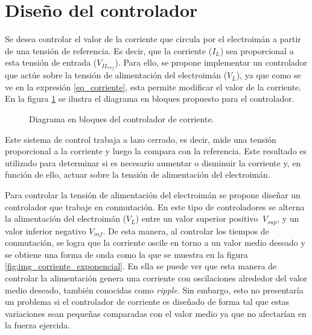 \section{Diseño del controlador}

Se desea controlar el valor de la corriente que circula por el electroimán a partir de una tensión de referencia. Es decir, que la corriente ($I_L$) sea proporcional a esta tensión de entrada ($V_{IL_{ref}}$). Para ello, se propone implementar un controlador que actúe sobre la tensión de alimentación del electroimán ($V_L$), ya que como se ve en la expresión \ref{eq_corriente}, esta permite modificar el valor de la corriente. En la figura \ref{fig:img_diagrama_bloques_basico_cc} se ilustra el diagrama en bloques propuesto para el controlador.


\begin{figure}[H]
	\centering
	
	\caption{Diagrama en bloques del controlador de corriente.}
	\label{fig:img_diagrama_bloques_basico_cc}
\end{figure}

Este sistema de control trabaja a lazo cerrado, es decir, mide una tensión proporcional a la corriente y luego la compara con la referencia. Este resultado es utilizado para determinar si es necesario aumentar o disminuir la corriente y, en función de ello, actuar sobre la tensión de alimentación del electroimán.

Para controlar la tensión de alimentación del electroimán se propone diseñar un controlador que trabaje en conmutación. En este tipo de controladores se alterna la alimentación del electroimán ($V_L$) entre un valor superior positivo $\ V_{sup}$, y un valor inferior negativo $V_{inf}$. De esta manera, al controlar los tiempos de conmutación, se logra que la corriente oscile en torno a un valor medio deseado y se obtiene una forma de onda como la que se muestra en la figura  \ref{fig:img_corriente_exponencial}. En ella se puede ver que esta manera de controlar la alimentación genera una corriente con oscilaciones alrededor del valor medio deseado, también conocidas como \textsl{ripple}. Sin embargo, esto no presentaría un problema si el controlador de corriente es diseñado de forma tal que estas variaciones sean pequeñas comparadas con el valor medio ya que no afectarían en la fuerza ejercida.

